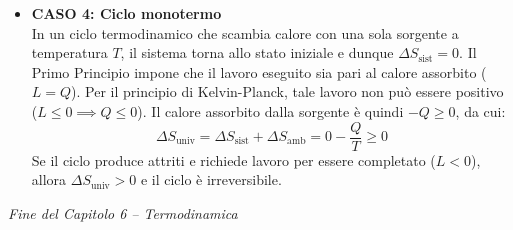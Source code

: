 \begin{itemize}
    \item \textbf{CASO 4: Ciclo monotermo} \\
    In un ciclo termodinamico che scambia calore con una sola sorgente a temperatura $T$, il sistema torna allo stato iniziale e dunque $\Delta S_{\text{sist}} = 0$. Il Primo Principio impone che il lavoro eseguito sia pari al calore assorbito ($L = Q$). Per il principio di Kelvin-Planck, tale lavoro non può essere positivo ($L \le 0 \implies Q \le 0$). Il calore assorbito dalla sorgente è quindi $-Q \ge 0$, da cui:
    \begin{equation}
        \Delta S_{\text{univ}} = \Delta S_{\text{sist}} + \Delta S_{\text{amb}} = 0 - \frac{Q}{T} \ge 0
    \end{equation}
    Se il ciclo produce attriti e richiede lavoro per essere completato ($L < 0$), allora $\Delta S_{\text{univ}} > 0$ e il ciclo è irreversibile.
\end{itemize}

\begin{flushright}
\textit{Fine del Capitolo 6 -- Termodinamica}
\end{flushright}
